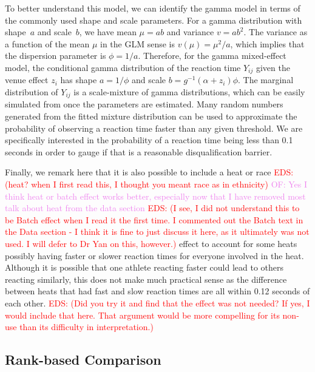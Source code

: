 \documentclass[12pt, letterpaper, titlepage]{article}
\newcommand{\eds}[1]{\textcolor{red}{EDS: (#1)}}
\newcommand{\of}[1]{\textcolor{violet}{OF: #1}}
\begin{document}
To better understand this model, we can identify the gamma model in terms of the
commonly used shape and scale parameters. For a gamma distribution with
shape~$a$ and scale~$b$, we have mean $\mu = ab$ and variance $v = ab^2$. The
variance as a function of the mean $\mu$ in the GLM sense is
$v(\mu) = \mu^2 / a$, which implies that the dispersion parameter is
$\phi = 1 / a$. Therefore, for the gamma mixed-effect model, the conditional
gamma distribution of the reaction time $Y_{ij}$ given the venue effect $z_i$
has shape $a = 1 / \phi$ and scale $b = g^{-1}(\alpha + z_i) \phi$. The marginal
distribution of $Y_{ij}$ is a scale-mixture of gamma distributions, which can be
easily simulated from once the parameters are estimated. Many
random numbers generated from the fitted mixture distribution can be used to
approximate the probability of observing a reaction time faster than any given
threshold.  We are specifically interested in the probability of a reaction time
 being less than 0.1 seconds in order to gauge if that is a reasonable 
disqualification barrier.

Finally, we remark here that it is also possible to include a heat or race 
\eds{heat? when I first read this, I thought you meant race as in ethnicity}
\of{Yes I think heat or batch effect works better, especially now that I have
removed most talk about heat from the data section} 
\eds{I see, I did not understand this to be Batch effect when I read it the 
first time.  I commented out the Batch text in the Data section - I think it is 
fine to just discuss it here, as it ultimately was not used.  I will defer to 
Dr Yan on this, however.}
effect to account for some heats possibly having faster or slower 
reaction times for everyone involved in the heat.
Although
it is possible that one athlete reacting faster could lead to others reacting
similarly, this does not make much practical sense as the difference between
heats that had fast and slow reaction times are all within 0.12 seconds of each
other. 
\eds{Did you try it and find that the effect was not needed?  If yes,
I would include that here.  That argument 
would be more compelling for its non-use than its difficulty in interpretation.} 


\subsection{Rank-based Comparison}\label{sec:rank}
\end{document}
